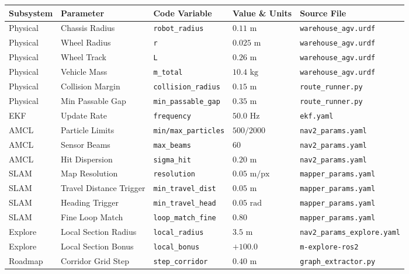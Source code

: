 \documentclass[10pt,a4paper]{article}
\begin{document}
\begin{center}
\footnotesize
\begin{tabular}{|l|l|l|l|l|}
\hline
\textbf{Subsystem} & \textbf{Parameter} & \textbf{Code Variable} & \textbf{Value \& Units} & \textbf{Source File} \\
\hline
Physical & Chassis Radius & \texttt{robot\_radius} & $0.11\text{ m}$ & \texttt{warehouse\_agv.urdf} \\
Physical & Wheel Radius & \texttt{r} & $0.025\text{ m}$ & \texttt{warehouse\_agv.urdf} \\
Physical & Wheel Track & \texttt{L} & $0.26\text{ m}$ & \texttt{warehouse\_agv.urdf} \\
Physical & Vehicle Mass & \texttt{m\_total} & $10.4\text{ kg}$ & \texttt{warehouse\_agv.urdf} \\
Physical & Collision Margin & \texttt{collision\_radius} & $0.15\text{ m}$ & \texttt{route\_runner.py} \\
Physical & Min Passable Gap & \texttt{min\_passable\_gap} & $0.35\text{ m}$ & \texttt{route\_runner.py} \\
\hline
EKF & Update Rate & \texttt{frequency} & $50.0\text{ Hz}$ & \texttt{ekf.yaml} \\
AMCL & Particle Limits & \texttt{min/max\_particles} & $500 / 2000$ & \texttt{nav2\_params.yaml} \\
AMCL & Sensor Beams & \texttt{max\_beams} & $60$ & \texttt{nav2\_params.yaml} \\
AMCL & Hit Dispersion & \texttt{sigma\_hit} & $0.20\text{ m}$ & \texttt{nav2\_params.yaml} \\
\hline
SLAM & Map Resolution & \texttt{resolution} & $0.05\text{ m/px}$ & \texttt{mapper\_params.yaml} \\
SLAM & Travel Distance Trigger & \texttt{min\_travel\_dist} & $0.05\text{ m}$ & \texttt{mapper\_params.yaml} \\
SLAM & Heading Trigger & \texttt{min\_travel\_head} & $0.05\text{ rad}$ & \texttt{mapper\_params.yaml} \\
SLAM & Fine Loop Match & \texttt{loop\_match\_fine} & $0.80$ & \texttt{mapper\_params.yaml} \\
Explore & Local Section Radius & \texttt{local\_radius} & $3.5\text{ m}$ & \texttt{nav2\_params\_explore.yaml} \\
Explore & Local Section Bonus & \texttt{local\_bonus} & $+100.0$ & \texttt{m-explore-ros2} \\
\hline
Roadmap & Corridor Grid Step & \texttt{step\_corridor} & $0.40\text{ m}$ & \texttt{graph\_extractor.py} \\

\end{tabular}
\end{center}
\end{document}
